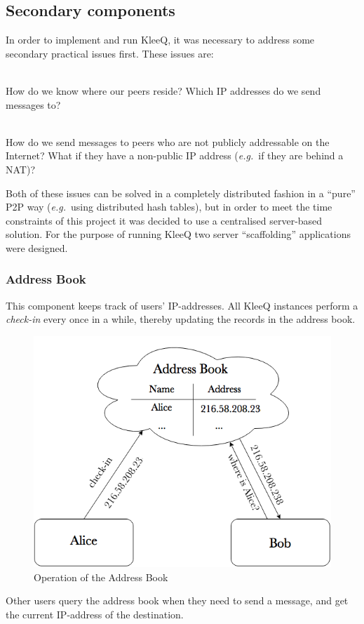 \documentclass[a4paper, twoside, 12pt]{report}
\begin{document}
\subsection{Secondary components}
In order to implement and run KleeQ, it was necessary to address some secondary practical issues first. These issues are:
\begin{description}[labelindent=0.5cm, leftmargin=1.3cm, rightmargin=0.5cm]
    \item[Contact Discovery] \hfill \\
        How do we know where our peers reside? Which IP addresses do we send messages to?
    \item[Transport] \hfill \\
        How do we send messages to peers who are not publicly addressable on the Internet? What if they have a non-public IP address (\textit{e.g.}~if they are behind a NAT)?
\end{description}

Both of these issues can be solved in a completely distributed fashion in a ``pure'' P2P way (\textit{e.g.}~using distributed hash tables), but in order to meet the time constraints of this project it was decided to use a centralised server-based solution. For the purpose of running KleeQ two server ``scaffolding'' applications were designed.

\subsubsection{Address Book}
        This component keeps track of users' IP-addresses. All KleeQ instances perform a \emph{check-in} every once in a while, thereby updating the records in the address book. 
        \begin{figure}[H]
            \centering
            \includegraphics[width = 0.50 \linewidth]{pics/addressBook.png}
            \caption{\label{fig:addressBook}Operation of the Address Book}
        \end{figure}
        Other users query the address book when they need to send a message, and get the current IP-address of the destination.
\end{document}
